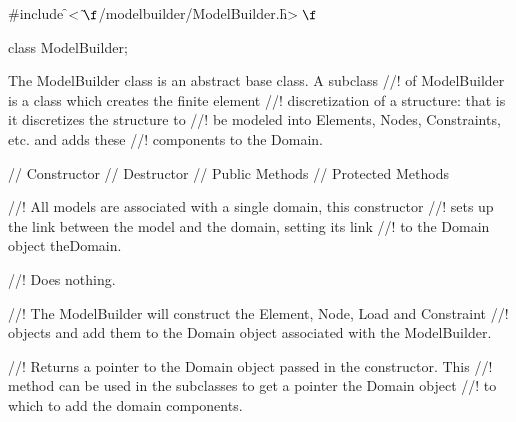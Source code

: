 
\indent \#include \f$<\tilde{ }\f$/modelbuilder/ModelBuilder.h\f$>\f$

\indent class ModelBuilder;


\indent The ModelBuilder class is an abstract base class. A subclass
//! of ModelBuilder is a class which creates the finite element
//! discretization of a structure: that is it discretizes the structure to
//! be modeled into Elements, Nodes, Constraints, etc. and adds these
//! components to the Domain.

\indent // Constructor 
\indent // Destructor 
\indent // Public Methods 
\indent // Protected Methods

//! All models are associated with a single domain, this constructor
//! sets up the link between the model and the domain, setting its link
//! to the Domain object \p theDomain.

//! Does nothing.

//! The ModelBuilder will construct the Element, Node, Load and Constraint
//! objects and add them to the Domain object associated with the ModelBuilder.

//! Returns a pointer to the Domain object passed in the constructor. This
//! method can be used in the subclasses to get a pointer the Domain object
//! to which to add the domain components.


